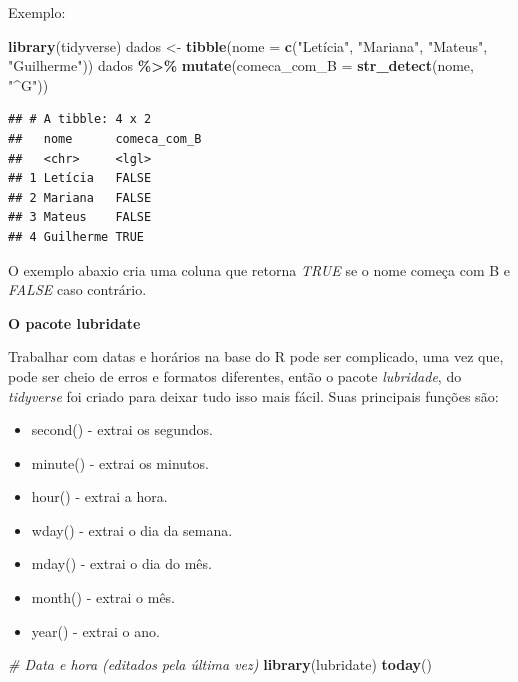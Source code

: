 \documentclass[
]{book}
\newenvironment{Shaded}{\begin{snugshade}}{\end{snugshade}}
\newcommand{\AttributeTok}[1]{\textcolor[rgb]{0.13,0.29,0.53}{#1}}
\newcommand{\CommentTok}[1]{\textcolor[rgb]{0.56,0.35,0.01}{\textit{#1}}}
\newcommand{\FunctionTok}[1]{\textcolor[rgb]{0.13,0.29,0.53}{\textbf{#1}}}
\newcommand{\NormalTok}[1]{#1}
\newcommand{\OtherTok}[1]{\textcolor[rgb]{0.56,0.35,0.01}{#1}}
\newcommand{\SpecialCharTok}[1]{\textcolor[rgb]{0.81,0.36,0.00}{\textbf{#1}}}
\newcommand{\StringTok}[1]{\textcolor[rgb]{0.31,0.60,0.02}{#1}}
\providecommand{\tightlist}{%
  \setlength{\itemsep}{0pt}\setlength{\parskip}{0pt}}
\begin{document}
Exemplo:

\begin{Shaded}
\begin{Highlighting}[]
\FunctionTok{library}\NormalTok{(tidyverse)}
\NormalTok{dados }\OtherTok{\textless{}{-}} \FunctionTok{tibble}\NormalTok{(}\AttributeTok{nome =} \FunctionTok{c}\NormalTok{(}\StringTok{"Letícia"}\NormalTok{, }\StringTok{"Mariana"}\NormalTok{, }\StringTok{"Mateus"}\NormalTok{, }\StringTok{"Guilherme"}\NormalTok{))}
\NormalTok{dados }\SpecialCharTok{\%\textgreater{}\%}
  \FunctionTok{mutate}\NormalTok{(}\AttributeTok{comeca\_com\_B =} \FunctionTok{str\_detect}\NormalTok{(nome, }\StringTok{"\^{}G"}\NormalTok{))}
\end{Highlighting}
\end{Shaded}

\begin{verbatim}
## # A tibble: 4 x 2
##   nome      comeca_com_B
##   <chr>     <lgl>       
## 1 Letícia   FALSE       
## 2 Mariana   FALSE       
## 3 Mateus    FALSE       
## 4 Guilherme TRUE
\end{verbatim}

O exemplo abaxio cria uma coluna que retorna \emph{TRUE} se o nome começa com B e \emph{FALSE} caso contrário.

\textbf{O pacote lubridate}

Trabalhar com datas e horários na base do R pode ser complicado, uma vez que, pode ser cheio de erros e formatos diferentes, então o pacote \emph{lubridade}, do \emph{tidyverse} foi criado para deixar tudo isso mais fácil. Suas principais funções são:

\begin{itemize}
\tightlist
\item
  second() - extrai os segundos.
\item
  minute() - extrai os minutos.
\item
  hour() - extrai a hora.
\item
  wday() - extrai o dia da semana.
\item
  mday() - extrai o dia do mês.
\item
  month() - extrai o mês.
\item
  year() - extrai o ano.
\end{itemize}

\begin{Shaded}
\begin{Highlighting}[]
\CommentTok{\# Data e hora (editados pela última vez)}
\FunctionTok{library}\NormalTok{(lubridate)}
\FunctionTok{today}\NormalTok{()}
\end{Highlighting}
\end{Shaded}
\end{document}
